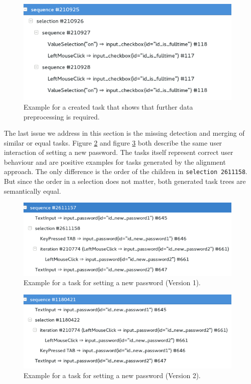 \begin{figure}[h]
	\centering
	\includegraphics[scale=0.75]{chapters/casestudy/preprocessing_needed.png}
	\caption{Example for a created task that shows that further data preprocessing is required.}
	\label{fig:preprocessing_needed}
\end{figure}
The last issue we address in this section is the missing detection and merging of similar or equal tasks.
Figure \ref{fig:newpassword} and figure \ref{fig:newpassword-1} both describe the same user interaction of setting a new password. 
The tasks itself represent correct user behaviour and are positive examples for tasks generated by the alignment approach.
The only difference is the order of the children in \texttt{selection 2611158}. 
But since the order in a selection does not matter, both generated task trees are semantically equal.
\begin{figure}
	\centering
	\includegraphics[scale=0.75]{chapters/casestudy/newpassword.png}
	\caption{Example for a task for setting a new password (Version 1).}
	\label{fig:newpassword}
\end{figure}
\begin{figure}
	\centering
	\includegraphics[scale=0.75]{chapters/casestudy/newpassword-1.png}
	\caption{Example for a task for setting a new password (Version 2).}
	\label{fig:newpassword-1}
\end{figure}

